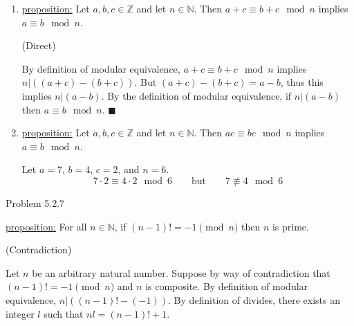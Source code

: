 \documentclass{article}
\theoremstyle{definition}
\newcommand{\Z}{\mathbb{Z}}
\newcommand{\N}{\mathbb{N}}
\begin{document}
	\begin{enumerate}

		\item[1]

		\underline{proposition:} Let $a,b,c\in \Z$ and let $n\in \N$. Then
		$a+c\equiv b+c \mod n$ implies $a\equiv b \mod n$.

		\vspace{.2cm}

		 (Direct) \vspace{.15cm}

		By definition of modular equivalence, $a+c\equiv b+c \mod n$ implies
		$n|((a+c)-(b+c))$. But $(a+c)-(b+c)=a-b$, thus this implies
		$n|(a-b)$. By the definition of modular equivalence, if $n|(a-b)$
		then $a\equiv b \mod n$.  $\blacksquare$

		\vspace{.2cm}

		\item[2]

		\underline{proposition:} Let $a,b,c\in \Z$ and let $n\in \N$. Then
		$ac\equiv bc \mod n$ implies $a\equiv b \mod n$.

		\vspace{.2cm}

		 \vspace{.15cm}

		Let $a=7$, $b=4$, $c=2$, and $n=6$.  $$7\cdot 2\equiv 4\cdot 2 \mod
		6\qquad \mbox{but}\qquad 7\not\equiv 4\mod 6$$

	\end{enumerate}

	\vspace{1cm}

	\newpage


	\noindent Problem 5.2.7  \vspace{0.3cm}

	\underline{proposition:} For all $n\in\N$, if $(n-1)!=-1\pmod{n}$ then $n$ is prime.

	\vspace{.2cm}

	 (Contradiction) \vspace{.15cm}

	Let $n$ be an arbitrary natural number. Suppose by way of contradiction that $(n-1)!=-1\pmod{n}$ and $n$ is composite. By definition of modular equivalence, $n|((n-1)!-(-1))$. By definition of divides, there exists an integer $l$ such that $nl=(n-1)!+1.$
\end{document}
